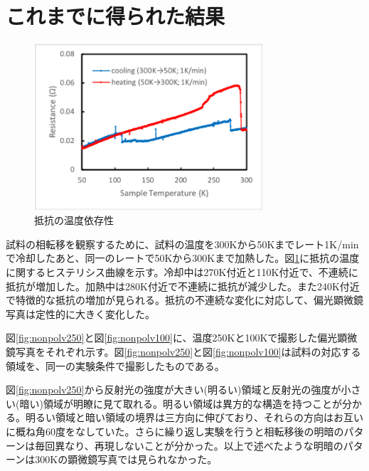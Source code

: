 \documentclass[11pt,a4paper]{jsarticle}
\begin{document}
\section{これまでに得られた結果}
\begin{figure}
\vspace{1zh}
  \begin{center}
  \vspace{-3zh}
   \hspace{-5mm}
   \includegraphics[width=85mm]{resistance50-300.eps}
  \end{center}
  \caption{抵抗の温度依存性}
  \label{fig:resistance50-300}
\end{figure}

試料の相転移を観察するために、試料の温度を300Kから50Kまでレート1K/minで冷却したあと、同一のレートで50Kから300Kまで加熱した。図\ref{fig:resistance50-300}に抵抗の温度に関するヒステリシス曲線を示す。冷却中は270K付近と110K付近で、不連続に抵抗が増加した。加熱中は280K付近で不連続に抵抗が減少した。また240K付近で特徴的な抵抗の増加が見られる。抵抗の不連続な変化に対応して、偏光顕微鏡写真は定性的に大きく変化した。

図\ref{fig:nonpolv250}と図\ref{fig:nonpolv100}に、温度250Kと100Kで撮影した偏光顕微鏡写真をそれぞれ示す。図\ref{fig:nonpolv250}と図\ref{fig:nonpolv100}は試料の対応する領域を、同一の実験条件で撮影したものである。

図\ref{fig:nonpolv250}から反射光の強度が大きい(明るい)領域と反射光の強度が小さい(暗い)領域が明瞭に見て取れる。明るい領域は異方的な構造を持つことが分かる。明るい領域と暗い領域の境界は三方向に伸びており、それらの方向はお互いに概ね角60度をなしていた。さらに繰り返し実験を行うと相転移後の明暗のパターンは毎回異なり、再現しないことが分かった。以上で述べたような明暗のパターンは300Kの顕微鏡写真では見られなかった。
\end{document}
